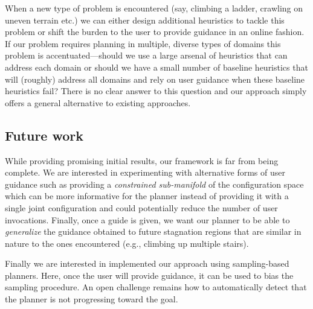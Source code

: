 \documentclass{article}
\begin{document}
When a new type of problem is encountered 
(say, climbing a ladder, crawling on uneven terrain etc.)
we can either design additional heuristics to tackle this problem or shift the burden to the user to provide guidance in an online fashion.
If our problem requires planning in multiple, diverse types of domains this problem is accentuated---should we  use a large arsenal of heuristics that can address each domain or should we have a small number of baseline heuristics that will (roughly) address all domains and rely on user guidance when these baseline heuristics fail?
There is no clear answer to this question and our approach simply offers a general alternative to existing approaches.


\subsection{Future work}
While providing promising initial results, our framework is far from being complete.
We are interested in experimenting with alternative forms of user guidance such as providing a \emph{constrained sub-manifold} of the configuration space which can be more informative for the planner instead of providing it with a single joint configuration and could potentially reduce the number of user invocations. 
Finally, once a guide is given, we want our planner to be able to \emph{generalize} the guidance obtained to future stagnation regions that are similar in nature to the ones encountered (e.g., climbing up multiple stairs).

Finally we are interested in implemented our approach using sampling-based planners. Here, once the user will provide guidance, it can be used to bias the sampling procedure. 
An open challenge remains how to automatically detect that the planner is not progressing toward the goal.



%

%

\end{document}
